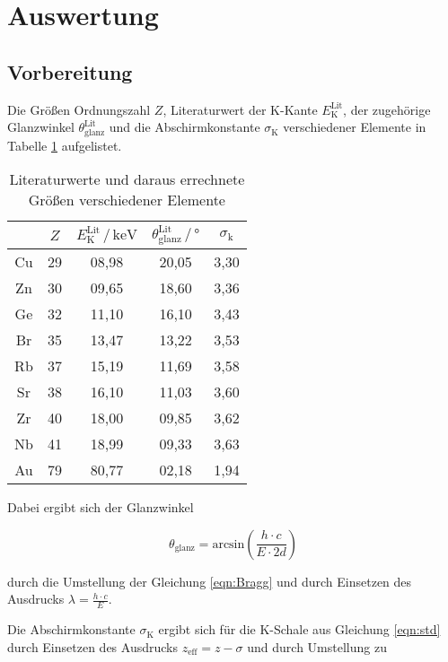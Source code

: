 \section{Auswertung}
\label{sec:Auswertung}

\subsection{Vorbereitung}

Die Größen Ordnungszahl $Z$, Literaturwert der
K-Kante $E_\text{K}^\text{Lit}$, der zugehörige Glanzwinkel 
$\theta_\text{glanz}^\text{Lit}$ und die Abschirmkonstante 
$\sigma_\text{K}$ verschiedener Elemente in Tabelle 
\ref{tab:literatur} aufgelistet.

\begin{table}
  \centering
  \caption{Literaturwerte und daraus errechnete Größen verschiedener Elemente}
  \label{tab:literatur}
  \begin{tabular}{c c c c c}
  \toprule
  $ $ & $Z$ & $E_\text{K}^\text{Lit} \,/\, \si{\kilo\eV}$
  & $\theta_\text{glanz}^\text{Lit} \,/\, \si{\degree}$ & 
  $\sigma_\text{k}$\\
  \midrule 
  Cu & 29 & 08,98 & 20,05 & 3,30 \\
  Zn & 30 & 09,65 & 18,60 & 3,36 \\
  Ge & 32 & 11,10 & 16,10 & 3,43 \\
  Br & 35 & 13,47 & 13,22 & 3,53 \\
  Rb & 37 & 15,19 & 11,69 & 3,58 \\
  Sr & 38 & 16,10 & 11,03 & 3,60 \\
  Zr & 40 & 18,00 & 09,85 & 3,62 \\
  Nb & 41 & 18,99 & 09,33 & 3,63 \\
  Au & 79 & 80,77 & 02,18 & 1,94 \\
  \bottomrule
  \end{tabular}
  \end{table}

Dabei ergibt sich der Glanzwinkel

  \begin{equation}
    \theta_\text{glanz} = \text{arcsin}\left(\frac{h \cdot c}{E \cdot 2d}\right)
    \label{eqn:theta}
  \end{equation}

  durch die Umstellung der Gleichung \eqref{eqn:Bragg} und durch Einsetzen 
  des Ausdrucks $\lambda = \frac{h \cdot c}{E}$.

  Die Abschirmkonstante $\sigma_\text{K}$ ergibt sich für die K-Schale aus Gleichung
  \eqref{eqn:std} durch Einsetzen des Ausdrucks $z_\text{eff} = z -\sigma$ und durch 
  Umstellung zu 


